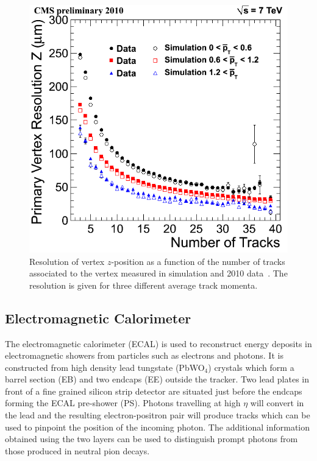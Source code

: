\begin{figure}
\begin{center}
	\includegraphics[width=.6\textwidth]{detector/trcker/zresotrcker.png}
	\caption{Resolution of vertex $z$-position as a function of the number 
	of tracks associated to the vertex measured in simulation and 
	2010 data~\citep{TRK-10-005}.
 	The resolution is given for three different average track momenta.}
	\label{fig:vtxreso}
\end{center}
\end{figure}

\subsection{Electromagnetic Calorimeter}
The electromagnetic calorimeter (ECAL) is used to reconstruct energy deposits in electromagnetic showers 
from particles such as electrons and photons. 
It is constructed from high density lead tungstate (PbWO$_{4}$) crystals which
form a barrel section (EB) and two endcaps (EE) outside the tracker. 
Two lead plates in front of a fine grained silicon strip detector are situated just before the 
endcaps forming the ECAL pre-shower (PS). 
Photons travelling at high $\eta$ will convert in the lead and the resulting electron-positron pair
will produce tracks which can be used to pinpoint the position of the incoming photon. The additional
information obtained using the two layers can be used to distinguish prompt photons from those produced
in neutral pion decays.

